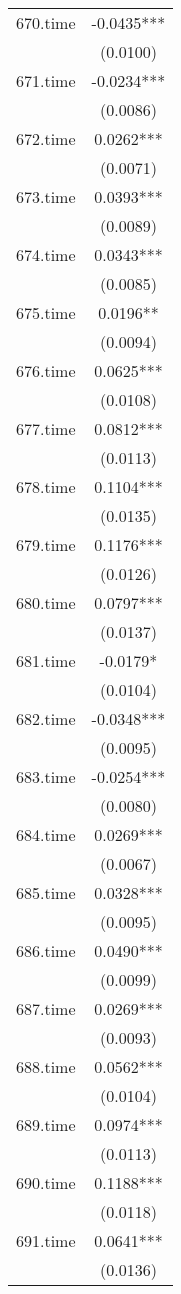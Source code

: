 \documentclass[]{article}
\begin{document}
\begin{tabular}{lc}
670.time & -0.0435*** \\
 & (0.0100) \\
671.time & -0.0234*** \\
 & (0.0086) \\
672.time & 0.0262*** \\
 & (0.0071) \\
673.time & 0.0393*** \\
 & (0.0089) \\
674.time & 0.0343*** \\
 & (0.0085) \\
675.time & 0.0196** \\
 & (0.0094) \\
676.time & 0.0625*** \\
 & (0.0108) \\
677.time & 0.0812*** \\
 & (0.0113) \\
678.time & 0.1104*** \\
 & (0.0135) \\
679.time & 0.1176*** \\
 & (0.0126) \\
680.time & 0.0797*** \\
 & (0.0137) \\
681.time & -0.0179* \\
 & (0.0104) \\
682.time & -0.0348*** \\
 & (0.0095) \\
683.time & -0.0254*** \\
 & (0.0080) \\
684.time & 0.0269*** \\
 & (0.0067) \\
685.time & 0.0328*** \\
 & (0.0095) \\
686.time & 0.0490*** \\
 & (0.0099) \\
687.time & 0.0269*** \\
 & (0.0093) \\
688.time & 0.0562*** \\
 & (0.0104) \\
689.time & 0.0974*** \\
 & (0.0113) \\
690.time & 0.1188*** \\
 & (0.0118) \\
691.time & 0.0641*** \\
 & (0.0136) \\

\end{tabular}
\end{document}
